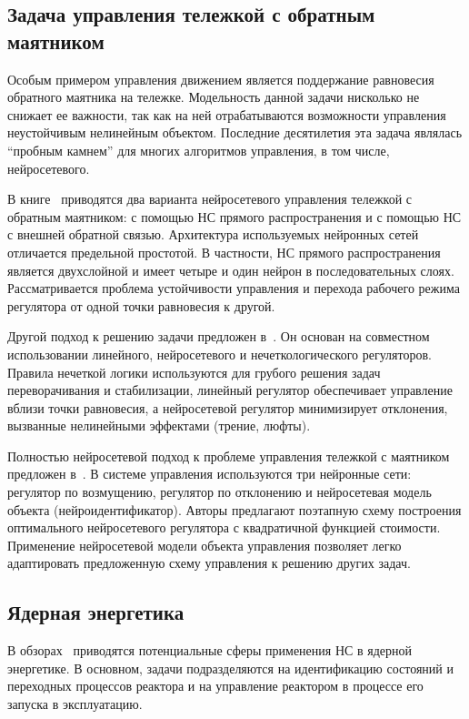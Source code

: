 \subsection{Задача управления тележкой с обратным маятником}

Особым примером управления движением является поддержание равновесия
обратного маятника на тележке.  Модельность данной задачи нисколько не
снижает ее важности, так как на ней отрабатываются возможности
управления неустойчивым нелинейным объектом.  Последние десятилетия
эта задача являлась ``пробным камнем'' для многих алгоритмов
управления, в том числе, нейросетевого.

В книге~\cite{suykens96} приводятся два варианта нейросетевого
управления тележкой с обратным маятником: с помощью НС прямого
распространения и с помощью НС с внешней обратной связью.  Архитектура
используемых нейронных сетей отличается предельной простотой.  В
частности, НС прямого распространения является двухслойной и имеет
четыре и один нейрон в последовательных слоях.  Рассматривается
проблема устойчивости управления и перехода рабочего режима регулятора
от одной точки равновесия к другой.

Другой подход к решению задачи предложен в~\cite{sigom00}.  Он основан
на совместном использовании линейного, нейросетевого и
нечеткологического регуляторов.  Правила нечеткой логики используются
для грубого решения задач переворачивания и стабилизации, линейный
регулятор обеспечивает управление вблизи точки равновесия, а
нейросетевой регулятор минимизирует отклонения, вызванные нелинейными
эффектами (трение, люфты).

Полностью нейросетевой подход к проблеме управления тележкой с
маятником предложен в~\cite{park96}.  В системе управления
используются три нейронные сети: регулятор по возмущению, регулятор по
отклонению и нейросетевая модель объекта (нейроидентификатор).  Авторы
предлагают поэтапную схему построения оптимального нейросетевого
регулятора с квадратичной функцией стоимости.  Применение нейросетевой
модели объекта управления позволяет легко адаптировать предложенную
схему управления к решению других задач.

\subsection{Ядерная энергетика}

В обзорах~\cite{uhrig91,zhuchkov02} приводятся потенциальные
сферы применения НС в ядерной энергетике.  В основном, задачи
подразделяются на идентификацию состояний и переходных процессов
реактора и на управление реактором в процессе его запуска в
эксплуатацию.

